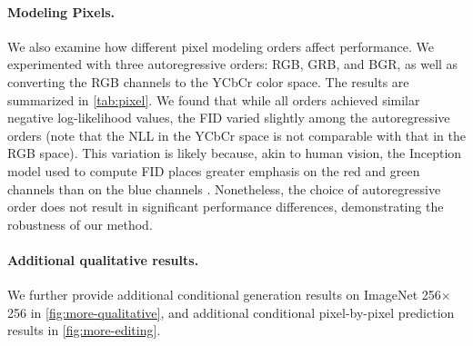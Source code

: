 \paragraph{Modeling Pixels.} We also examine how different pixel modeling orders affect performance. We experimented with three autoregressive orders: RGB, GRB, and BGR, as well as converting the RGB channels to the YCbCr color space. The results are summarized in \autoref{tab:pixel}. We found that while all orders achieved similar negative log-likelihood values, the FID varied slightly among the autoregressive orders (note that the NLL in the YCbCr space is not comparable with that in the RGB space). This variation is likely because, akin to human vision, the Inception model used to compute FID places greater emphasis on the red and green channels than on the blue channels \citep{mustafi2009structure}. Nonetheless, the choice of autoregressive order does not result in significant performance differences, demonstrating the robustness of our method.

\paragraph{Additional qualitative results.} We further provide additional conditional generation results on ImageNet 256$\times$256 in \autoref{fig:more-qualitative}, and additional conditional pixel-by-pixel prediction results in \autoref{fig:more-editing}.




